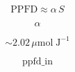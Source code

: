 \documentclass[preview,border=2pt]{standalone}
\begin{document}
\[
\mathrm{PPFD} \approx \alpha\, S
\]

\[
\alpha
\]

\[
\sim 2.02\,\mu\mathrm{mol}\;\mathrm{J}^{-1}
\]

\[
\mathrm{ppfd\_in}
\]
\end{document}
